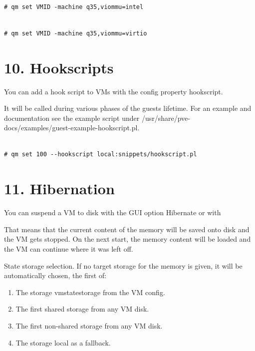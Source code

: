 \begin{lstlisting}

# qm set VMID -machine q35,viommu=intel

\end{lstlisting}

\begin{lstlisting}

# qm set VMID -machine q35,viommu=virtio

\end{lstlisting}


\section{10. Hookscripts}

You can add a hook script to VMs with the config property hookscript.

It will be called during various phases of the guests lifetime. For an example and documentation see the example script under /usr/share/pve-docs/examples/guest-example-hookscript.pl.

\begin{lstlisting}

# qm set 100 --hookscript local:snippets/hookscript.pl

\end{lstlisting}


\section{11. Hibernation}

You can suspend a VM to disk with the GUI option Hibernate or with

That means that the current content of the memory will be saved onto disk and the VM gets stopped. On the next start, the memory content will be loaded and the VM can continue where it was left off.

State storage selection. If no target storage for the memory is given, it will be automatically chosen, the first of:

\begin{enumerate}[leftmargin=2cm]

	\item The storage vmstatestorage from the VM config.

	\item The first shared storage from any VM disk.

	\item The first non-shared storage from any VM disk.

	\item The storage local as a fallback.

\end{enumerate}

